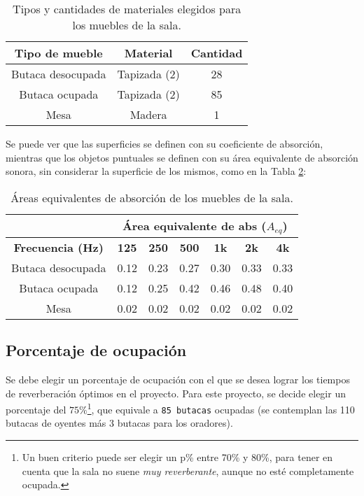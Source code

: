 		\begin{table}[H]
			\centering
			\begin{tabular}{ccc}
			\toprule
			\textbf{Tipo de mueble} & \textbf{Material} & \textbf{Cantidad}\\ \midrule
			Butaca desocupada & Tapizada (2)& 28\\ \midrule
			Butaca ocupada & Tapizada (2)& 85\\ \midrule
			Mesa & Madera & 1\\ \bottomrule
			\end{tabular}
			\caption{Tipos y cantidades de materiales elegidos para los muebles de la sala.}
			\label{tabla:muebles}
		\end{table}
		
		Se puede ver que las superficies se definen con su coeficiente de absorción, mientras que los objetos puntuales se definen con su área equivalente de absorción sonora, sin considerar la superficie de los mismos, como en la Tabla \ref{tabla:coeficientes_muebles}:
		
		\begin{table}[H]
			\centering
			\begin{tabular}{@{}ccccccc@{}}
					& \multicolumn{6}{c}{\textbf{Área equivalente de abs ($A_{eq}$)}}\\ \toprule
				\textbf{Frecuencia (Hz)} & \textbf{125} & \textbf{250} & \textbf{500} & \textbf{1k} & \textbf{2k} & \textbf{4k}   \\ \midrule
					Butaca desocupada   & 0.12 & 0.23 & 0.27 & 0.30 & 0.33 & 0.33 \\ \midrule
					Butaca ocupada      & 0.12 & 0.25 & 0.42 & 0.46 & 0.48 & 0.40 \\ \midrule
					Mesa                & 0.02 & 0.02 & 0.02 & 0.02 & 0.02 & 0.02 \\ \bottomrule
			\end{tabular}%
			\caption{Áreas equivalentes de absorción de los muebles de la sala.}
			\label{tabla:coeficientes_muebles}
		\end{table}

\subsection{Porcentaje de ocupación}

	Se debe elegir un porcentaje de ocupación con el que se desea lograr los tiempos de reverberación óptimos en el proyecto. Para este proyecto, se decide elegir un porcentaje del $75\%$\footnote{Un buen criterio puede ser elegir un p\% entre 70\% y 80\%, para tener en cuenta que la sala no suene \textit{muy reverberante}, aunque no esté completamente ocupada.}, que equivale a \texttt{85 butacas} ocupadas (se contemplan las 110 butacas de oyentes más 3 butacas para los oradores).\\
	
